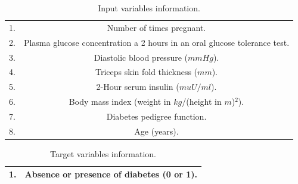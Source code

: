 \begin{table}[h!]
\begin{center}
\begin{tabular}{cc}
\hline
1. & Number of times pregnant.\\
2. & Plasma glucose concentration a 2 hours in an oral glucose tolerance test.\\
3. & Diastolic blood pressure ($mm Hg$).  \\
4. & Triceps skin fold thickness ($mm$).  \\
5. & 2-Hour serum insulin ($mu U/ml$). \\
6. & Body mass index (weight in $kg$/(height in $m$)$^2$). \\
7. & Diabetes pedigree function. \\
8. & Age (years). \\
\hline
\end{tabular}\caption{Input variables information.}\label{InputVariablesInformation}
\end{center}
\end{table}

\begin{table}[h!]
\begin{center}
\begin{tabular}{cc}
\hline
1. & Absence or presence of diabetes (0 or 1). \\
\hline
\end{tabular}\caption{Target variables information.}\label{TargetVariablesInformation}
\end{center}
\end{table}

